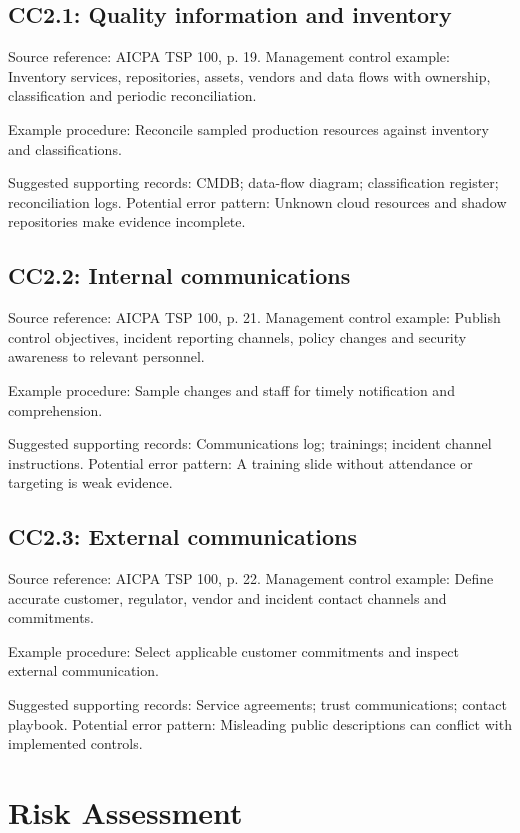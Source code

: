\documentclass[10pt,oneside]{report}
\begin{document}
\subsection*{CC2.1: Quality information and inventory}
Source reference: AICPA TSP 100, p. 19. Management control example: Inventory services, repositories, assets, vendors and data flows with ownership, classification and periodic reconciliation.

Example procedure: Reconcile sampled production resources against inventory and classifications.

Suggested supporting records: CMDB; data-flow diagram; classification register; reconciliation logs. Potential error pattern: Unknown cloud resources and shadow repositories make evidence incomplete.

\subsection*{CC2.2: Internal communications}
Source reference: AICPA TSP 100, p. 21. Management control example: Publish control objectives, incident reporting channels, policy changes and security awareness to relevant personnel.

Example procedure: Sample changes and staff for timely notification and comprehension.

Suggested supporting records: Communications log; trainings; incident channel instructions. Potential error pattern: A training slide without attendance or targeting is weak evidence.

\subsection*{CC2.3: External communications}
Source reference: AICPA TSP 100, p. 22. Management control example: Define accurate customer, regulator, vendor and incident contact channels and commitments.

Example procedure: Select applicable customer commitments and inspect external communication.

Suggested supporting records: Service agreements; trust communications; contact playbook. Potential error pattern: Misleading public descriptions can conflict with implemented controls.

\section{Risk Assessment}
\end{document}

